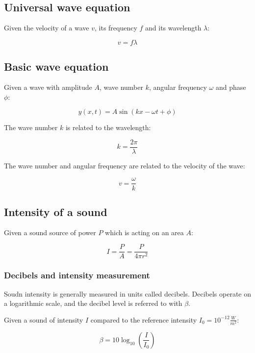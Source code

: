 \documentclass[12pt]{article}
\begin{document}
\subsection{Universal wave equation}

Given the velocity of a wave $v$, its frequency $f$ and its wavelength $\lambda$:

\[
\boxed{
v = f\lambda
}
\]

\subsection{Basic wave equation}

Given a wave with amplitude $A$, wave number $k$, angular frequency $\omega$ and phase $\phi$:

\[
\boxed{
y(x,t) = A\sin(kx - \omega t + \phi)
}
\]

The wave number $k$ is related to the wavelength:

\[
\boxed{
k = \frac{2\pi}{\lambda}
}
\]

The wave number and angular frequency are related to the velocity of the wave:

\[
\boxed{
v = \frac{\omega}{k}
}
\]


\subsection{Intensity of a sound}

Given a sound source of power $P$ which is acting on an area $A$:

\[
\boxed{
I = \frac{P}{A} = \frac{P}{4\pi r^2}
}
\]

\subsubsection{Decibels and intensity measurement}

Soudn intensity is generally measured in units called decibels.
Decibels operate on a logarithmic scale, and the decibel level is referred to with $\beta$.

Given a sound of intensity $I$ compared to the reference intensity $I_0 = 10^{-12} \frac{W}{m^2}$:

\[
\boxed{
\beta = 10\log_{10}\left(\frac{I}{I_0}\right)
}
\]
\end{document}
